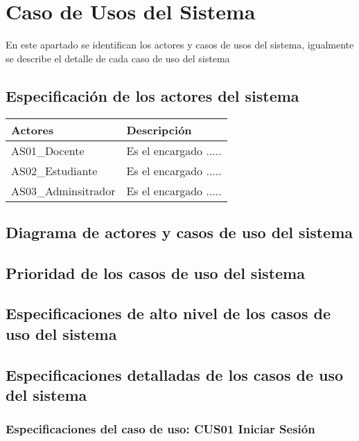 \chapter{Caso de Usos del Sistema}

En este apartado se identifican los actores y casos de usos del sistema, igualmente se describe 
el detalle de cada caso de uso del sistema


\section{Especificación de los actores del sistema}


	\begin{table}[h!]	
		\begin{tabular}{ |p{4cm}|p{9cm}| }	\hline
			
			\rowcolor{gray!50}  \textbf{Actores}  &  \textbf{Descripción} \\ \hline
			
			AS01\_Docente & Es el encargado .....  \\	\hline
			
			AS02\_Estudiante & Es el encargado .....  \\	\hline
			
			AS03\_Adminsitrador & Es el encargado .....  \\	\hline
			
		\end{tabular}
	\end{table}	


\section{Diagrama de actores y casos de uso del sistema}



\section{Prioridad de los casos de uso del sistema}

\section{Especificaciones de alto nivel de los casos de uso del sistema}

\section{Especificaciones detalladas de los casos de uso del sistema}

\subsection{Especificaciones del caso de uso: CUS01 Iniciar Sesión}
